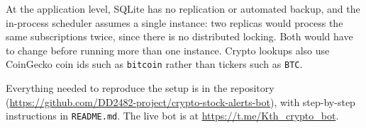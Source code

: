 \documentclass[11pt,a4paper]{article}
\begin{document}
At the application level, SQLite has no replication or automated backup, and the in-process scheduler assumes a single instance: two replicas would process the same subscriptions twice, since there is no distributed locking. Both would have to change before running more than one instance. Crypto lookups also use CoinGecko coin ids such as \texttt{bitcoin} rather than tickers such as \texttt{BTC}.

Everything needed to reproduce the setup is in the repository (\url{https://github.com/DD2482-project/crypto-stock-alerts-bot}), with step-by-step instructions in \texttt{README.md}. The live bot is at \url{https://t.me/Kth_crypto_bot}.
\end{document}
